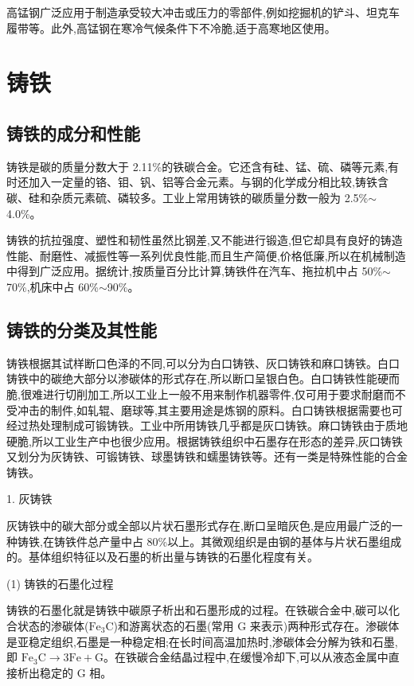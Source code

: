 \documentclass[UTF8]{ctexbook}
\newcommand{\◎}{\ensuremath{\bigcirc}}
\begin{document}
高锰钢广泛应用于制造承受较大冲击或压力的零部件,例如挖掘机的铲斗、坦克车履带等。此外,高锰钢在寒冷气候条件下不冷脆,适于高寒地区使用。

\section{铸铁}

\subsection{铸铁的成分和性能}

铸铁是碳的质量分数大于 2.11\%的铁碳合金。它还含有硅、锰、硫、磷等元素,有时还加入一定量的铬、钼、钒、铝等合金元素。与钢的化学成分相比较,铸铁含碳、硅和杂质元素硫、磷较多。工业上常用铸铁的碳质量分数一般为 2.5\%$\sim$4.0\%。

铸铁的抗拉强度、塑性和韧性虽然比钢差,又不能进行锻造,但它却具有良好的铸造性能、耐磨性、减振性等一系列优良性能,而且生产简便,价格低廉,所以在机械制造中得到广泛应用。据统计,按质量百分比计算,铸铁件在汽车、拖拉机中占 50\%$\sim$70\%,机床中占 60\%$\sim$90\%。

\subsection{铸铁的分类及其性能}

铸铁根据其试样断口色泽的不同,可以分为白口铸铁、灰口铸铁和麻口铸铁。白口铸铁中的碳绝大部分以渗碳体的形式存在,所以断口呈银白色。白口铸铁性能硬而脆,很难进行切削加工,所以工业上一般不用来制作机器零件,仅可用于要求耐磨而不受冲击的制件,如轧辊、磨球等,其主要用途是炼钢的原料。白口铸铁根据需要也可经过热处理制成可锻铸铁。工业中所用铸铁几乎都是灰口铸铁。麻口铸铁由于质地硬脆,所以工业生产中也很少应用。根据铸铁组织中石墨存在形态的差异,灰口铸铁又划分为灰铸铁、可锻铸铁、球墨铸铁和蠕墨铸铁等。还有一类是特殊性能的合金铸铁。

1. 灰铸铁

灰铸铁中的碳大部分或全部以片状石墨形式存在,断口呈暗灰色,是应用最广泛的一种铸铁,在铸铁件总产量中占 80\%以上。其微观组织是由钢的基体与片状石墨组成的。基体组织特征以及石墨的析出量与铸铁的石墨化程度有关。

(1) 铸铁的石墨化过程

铸铁的石墨化就是铸铁中碳原子析出和石墨形成的过程。在铁碳合金中,碳可以化合状态的渗碳体($\text{Fe}_3\text{C}$)和游离状态的石墨(常用 G 来表示)两种形式存在。渗碳体是亚稳定组织,石墨是一种稳定相;在长时间高温加热时,渗碳体会分解为铁和石墨,即 $\text{Fe}_3\text{C}\rightarrow 3\text{Fe}+\text{G}$。在铁碳合金结晶过程中,在缓慢冷却下,可以从液态金属中直接析出稳定的 G 相。
\end{document}
